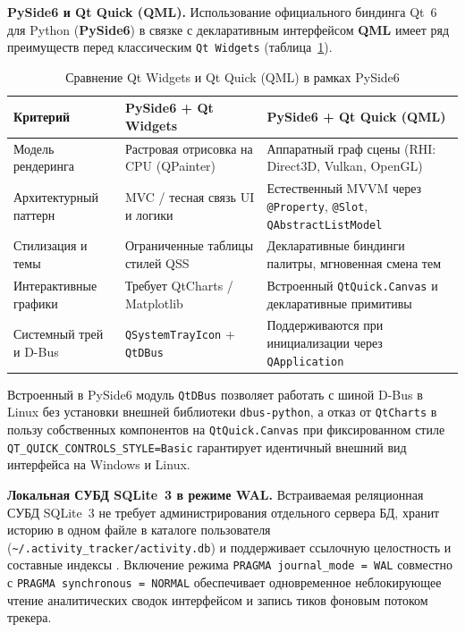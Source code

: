\documentclass{timcw}
\begin{document}
\textbf{PySide6 и Qt Quick (QML).} Использование официального биндинга Qt~6 для Python (\textbf{PySide6}) в связке с декларативным интерфейсом \textbf{QML} \cite{pyside6, qt_quick} имеет ряд преимуществ перед классическим \texttt{Qt Widgets} (таблица~\ref{tab:ui_comparison}).

\begin{table}[H]
\centering
\caption{Сравнение Qt Widgets и Qt Quick (QML) в рамках PySide6}
\label{tab:ui_comparison}
\footnotesize
\begin{tabularx}{\textwidth}{>{\raggedright\arraybackslash}p{3.5cm} >{\raggedright\arraybackslash}X >{\raggedright\arraybackslash}X}
\toprule
\textbf{Критерий} & \textbf{PySide6 + Qt Widgets} & \textbf{PySide6 + Qt Quick (QML)} \\
\midrule
Модель рендеринга & Растровая отрисовка на CPU (QPainter) & Аппаратный граф сцены (RHI: Direct3D, Vulkan, OpenGL) \\
Архитектурный паттерн & MVC / тесная связь UI и логики & Естественный MVVM через \texttt{@Property}, \texttt{@Slot}, \texttt{QAbstractListModel} \\
Стилизация и темы & Ограниченные таблицы стилей QSS & Декларативные биндинги палитры, мгновенная смена тем \\
Интерактивные графики & Требует QtCharts / Matplotlib & Встроенный \texttt{QtQuick.Canvas} и декларативные примитивы \\
Системный трей и D-Bus & \texttt{QSystemTrayIcon} + \texttt{QtDBus} & Поддерживаются при инициализации через \texttt{QApplication} \\
\bottomrule
\end{tabularx}
\end{table}

Встроенный в PySide6 модуль \texttt{QtDBus} позволяет работать с шиной D-Bus в Linux без установки внешней библиотеки \texttt{dbus-python}, а отказ от \texttt{QtCharts} в пользу собственных компонентов на \texttt{QtQuick.Canvas} при фиксированном стиле \texttt{QT\_QUICK\_CONTROLS\_STYLE=Basic} гарантирует идентичный внешний вид интерфейса на Windows и Linux.

\textbf{Локальная СУБД SQLite~3 в режиме WAL.} Встраиваемая реляционная СУБД SQLite~3 не требует администрирования отдельного сервера БД, хранит историю в одном файле в каталоге пользователя (\texttt{\textasciitilde/.activity\_tracker/activity.db}) и поддерживает ссылочную целостность и составные индексы \cite{sqlite_wal, kleppmann_ddia}. Включение режима \texttt{PRAGMA journal\_mode = WAL} совместно с \texttt{PRAGMA synchronous = NORMAL} обеспечивает одновременное неблокирующее чтение аналитических сводок интерфейсом и запись тиков фоновым потоком трекера.
\end{document}
